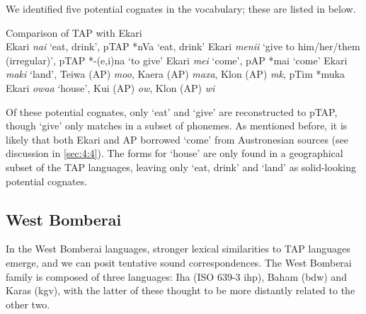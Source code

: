 We identified five potential cognates in the vocabulary; these are listed in  below.

\ea%
\label{ex:4:59}
\upshape 
  Comparison of TAP with Ekari \citep{Steltenpool1969} \\
  \ea \upshape   Ekari \textit{nai} `eat, drink', pTAP *nVa `eat, drink'
  \ex \upshape  Ekari \textit{menii} `give to him/her/them (irregular)', pTAP *-(e,i)na `to give'
  \ex \upshape  Ekari \textit{mei} `come', pAP *mai `come'
  \ex \upshape  Ekari \textit{maki} `land', Teiwa (AP) \textit{mo{\pharfric}o}\textit{{\textglotstop}}, Kaera (AP) \textit{maxa}, Klon (AP) \textit{m}\textit{{\textschwa}}\textit{k}\textit{{\textepsilon}{\textglotstop}}, pTim *muka
  \ex \upshape  Ekari \textit{owaa} `house', Kui (AP) \textit{ow}, Klon (AP) \textit{{\textschwa}}\textit{wi}
  \z
\z



Of these potential cognates, only `eat' and `give' are reconstructed to pTAP, though `give' only matches in a subset of phonemes. As mentioned before, it is likely that both Ekari and AP borrowed `come' from Austronesian sources (see discussion in {\SS} \ref{sec:4:4}). The forms for `house' are only found in a geographical subset of the TAP languages, leaving only `eat, drink' and `land' as solid-looking potential cognates.

\subsection{West Bomberai}
In the West Bomberai languages, stronger lexical similarities to TAP languages emerge, and we can posit tentative sound correspondences. The West Bomberai family is composed of three languages: Iha (ISO 639-3 ihp), Baham (bdw) and Karas (kgv), with the latter of these thought to be more distantly related to the other two.

